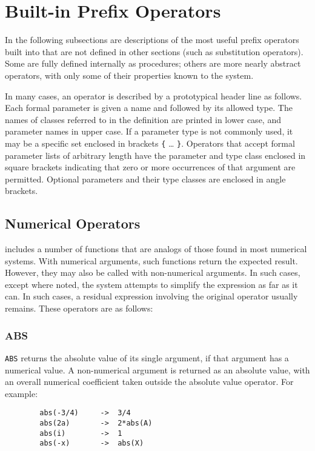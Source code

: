 \chapter{Built-in Prefix Operators}
In the following subsections are descriptions of the most  useful prefix
operators built into {\REDUCE} that are not defined in other sections (such
as substitution operators). Some are fully defined internally as
procedures; others are more nearly abstract operators, with only some of
their properties known to the system.

In many cases, an operator is described by a prototypical header line as
follows. Each formal parameter is given a name and followed by its allowed
type. The names of classes referred to in the definition are printed in
lower case, and parameter names in upper case. If a parameter type is not
commonly used, it may be a specific set enclosed in brackets
\texttt{\{} \ldots{} \texttt{\}}.
Operators that accept formal parameter lists of arbitrary length have the
parameter and type class enclosed in square brackets indicating that zero
or more occurrences of that argument are permitted. Optional parameters
and their type classes are enclosed in angle brackets.

\section{Numerical Operators}
{\REDUCE} includes a number of functions that are analogs of those found
in most numerical systems.  With numerical arguments, such functions
return the expected result.  However, they may also be called with
non-numerical arguments.  In such cases, except where noted, the system
attempts to simplify the expression as far as it can.  In such cases, a
residual expression involving the original operator usually remains.
These operators are as follows:

\subsection{ABS}
\hypertarget{operator:ABS}{}
\texttt{ABS} returns the absolute value
of its single argument, if that argument has a numerical value.
A non-numerical argument is returned as an absolute value, with an overall
numerical coefficient taken outside the absolute value operator. For example:
\begin{verbatim}
        abs(-3/4)     ->  3/4
        abs(2a)       ->  2*abs(A)
        abs(i)        ->  1
        abs(-x)       ->  abs(X)
\end{verbatim}

